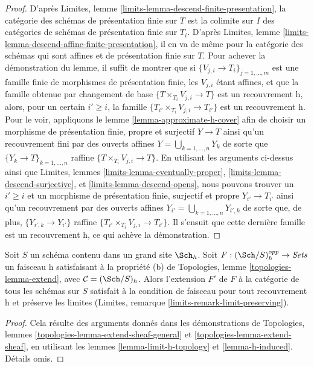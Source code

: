 \begin{proof}
D'après Limites, lemme \ref{limits-lemma-descend-finite-presentation},
la catégorie des schémas de présentation finie sur $T$ est la
colimite sur $I$ des catégories de schémas de présentation finie sur $T_i$. D'après
Limites, lemme \ref{limits-lemma-descend-affine-finite-presentation},
il en va de même pour la catégorie des schémas qui sont affines et
de présentation finie sur $T$.
Pour achever la démonstration du lemme, il suffit de montrer que si
$\{V_{j, i} \to T_i\}_{j = 1, \ldots, m}$ est une famille finie de
morphismes de présentation finie, les $V_{j, i}$ étant affines, et que la
famille obtenue par changement de base $\{T \times_{T_i} V_{j, i} \to T\}$ est
un recouvrement h, alors, pour un certain $i' \geq i$, la famille
$\{T_{i'} \times_{T_i} V_{j, i} \to T_{i'}\}$ est un recouvrement h.
Pour le voir, appliquons le lemme \ref{lemma-approximate-h-cover} afin de
choisir un morphisme de présentation finie, propre et surjectif
$Y \to T$ ainsi qu'un recouvrement fini par des ouverts affines
$Y = \bigcup_{k = 1, \ldots, n} Y_k$ de sorte que
$\{Y_k \to T\}_{k = 1, \ldots, n}$ raffine
$\{T \times_{T_i} V_{j, i} \to T\}$.
En utilisant les arguments ci-dessus ainsi que
Limites, lemmes \ref{limits-lemma-eventually-proper},
\ref{limits-lemma-descend-surjective}, et
\ref{limits-lemma-descend-opens},
nous pouvons trouver un $i' \geq i$ et un morphisme de présentation finie, surjectif et propre
$Y_{i'} \to T_{i'}$ ainsi qu'un recouvrement par des ouverts affines
$Y_{i'} = \bigcup_{k = 1, \ldots, n} Y_{i', k}$
de sorte que, de plus, $\{Y_{i', k} \to Y_{i'}\}$ raffine
$\{T_{i'} \times_{T_i} V_{j, i} \to T_{i'}\}$.
Il s'ensuit que cette dernière famille est
un recouvrement h, ce qui achève la démonstration.
\end{proof}

\begin{lemma}
\label{lemma-extend-sheaf-h}
Soit $S$ un schéma contenu dans un grand site $\Sch_h$.
Soit $F : (\Sch/S)_h^{opp} \to \textit{Sets}$ un faisceau h satisfaisant à
la propriété (b) de Topologies, lemme \ref{topologies-lemma-extend},
avec $\mathcal{C} = (\Sch/S)_h$.
Alors l'extension $F'$ de $F$ à la catégorie de tous les
schémas sur $S$ satisfait à la condition de faisceau pour tout recouvrement h
et préserve les limites (Limites, remarque \ref{limits-remark-limit-preserving}).
\end{lemma}

\begin{proof}
Cela résulte des arguments donnés dans les démonstrations de
Topologies, lemmes \ref{topologies-lemma-extend-sheaf-general} et
\ref{topologies-lemma-extend-sheaf}, en utilisant les
lemmes \ref{lemma-limit-h-topology} et \ref{lemma-h-induced}.
Détails omis.
\end{proof}








